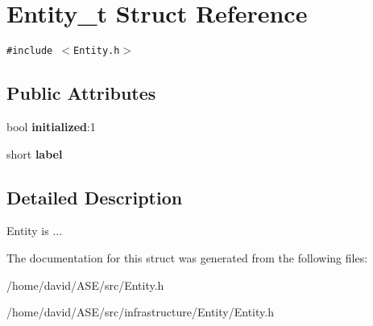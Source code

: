 \hypertarget{structEntity__t}{
\section{Entity\_\-t Struct Reference}
\label{structEntity__t}
}
{\tt \#include $<$Entity.h$>$}

\subsection*{Public Attributes}
\begin{CompactItemize}
\item 
\hypertarget{structEntity__t_e557dee68a3b8eef6f8d960af3a322f0}{
bool \textbf{initialized}:1}
\label{structEntity__t_e557dee68a3b8eef6f8d960af3a322f0}

\item 
\hypertarget{structEntity__t_f89a8eab14338d075700a9d9f7425359}{
short \textbf{label}}
\label{structEntity__t_f89a8eab14338d075700a9d9f7425359}

\end{CompactItemize}


\subsection{Detailed Description}
Entity is ... 

The documentation for this struct was generated from the following files:\begin{CompactItemize}
\item 
/home/david/ASE/src/Entity.h\item 
/home/david/ASE/src/infrastructure/Entity/Entity.h\end{CompactItemize}
